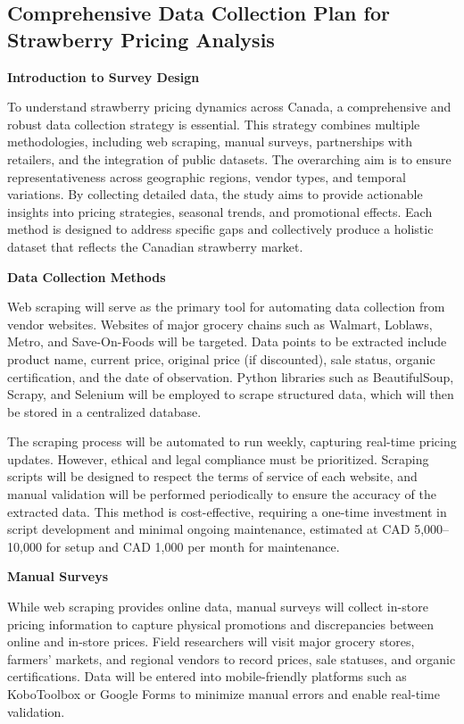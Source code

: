 \documentclass[
  letterpaper,
  DIV=11,
  numbers=noendperiod]{scrartcl}
\begin{document}
\subsection{Comprehensive Data Collection Plan for Strawberry Pricing
Analysis}\label{comprehensive-data-collection-plan-for-strawberry-pricing-analysis}

\textbf{Introduction to Survey Design}

To understand strawberry pricing dynamics across Canada, a comprehensive
and robust data collection strategy is essential. This strategy combines
multiple methodologies, including web scraping, manual surveys,
partnerships with retailers, and the integration of public datasets. The
overarching aim is to ensure representativeness across geographic
regions, vendor types, and temporal variations. By collecting detailed
data, the study aims to provide actionable insights into pricing
strategies, seasonal trends, and promotional effects. Each method is
designed to address specific gaps and collectively produce a holistic
dataset that reflects the Canadian strawberry market.

\textbf{Data Collection Methods}

Web scraping will serve as the primary tool for automating data
collection from vendor websites. Websites of major grocery chains such
as Walmart, Loblaws, Metro, and Save-On-Foods will be targeted. Data
points to be extracted include product name, current price, original
price (if discounted), sale status, organic certification, and the date
of observation. Python libraries such as BeautifulSoup, Scrapy, and
Selenium will be employed to scrape structured data, which will then be
stored in a centralized database.

The scraping process will be automated to run weekly, capturing
real-time pricing updates. However, ethical and legal compliance must be
prioritized. Scraping scripts will be designed to respect the terms of
service of each website, and manual validation will be performed
periodically to ensure the accuracy of the extracted data. This method
is cost-effective, requiring a one-time investment in script development
and minimal ongoing maintenance, estimated at CAD 5,000--10,000 for
setup and CAD 1,000 per month for maintenance.

\textbf{Manual Surveys}

While web scraping provides online data, manual surveys will collect
in-store pricing information to capture physical promotions and
discrepancies between online and in-store prices. Field researchers will
visit major grocery stores, farmers' markets, and regional vendors to
record prices, sale statuses, and organic certifications. Data will be
entered into mobile-friendly platforms such as KoboToolbox or Google
Forms to minimize manual errors and enable real-time validation.
\end{document}
